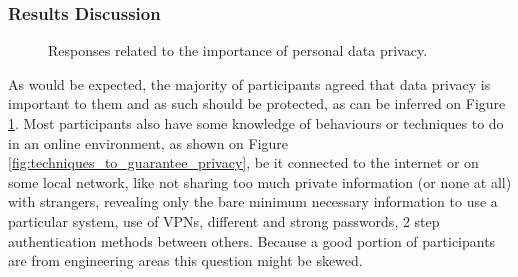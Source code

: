 \subsubsection{Results Discussion}

\begin{figure}
    \begin{center}
        \caption{Responses related to the importance of personal data privacy.}
        \label{fig:privacy_is_important_to_me}
    \end{center}
\end{figure}

As would be expected, the majority of participants agreed that data privacy
is important to them and as such should be protected, as can be inferred
on Figure \ref{fig:privacy_is_important_to_me}. Most participants
also have some knowledge of behaviours or techniques to do
in an online environment, as shown on Figure \ref{fig:techniques_to_guarantee_privacy}, be it connected to the internet or on some
local network, like not sharing too much private information
(or none at all) with strangers, revealing only the bare minimum necessary
information to use a particular system, use of VPNs, different and strong
passwords, 2 step authentication methods between others. Because a good
portion of participants are from engineering areas this question might be
skewed.

